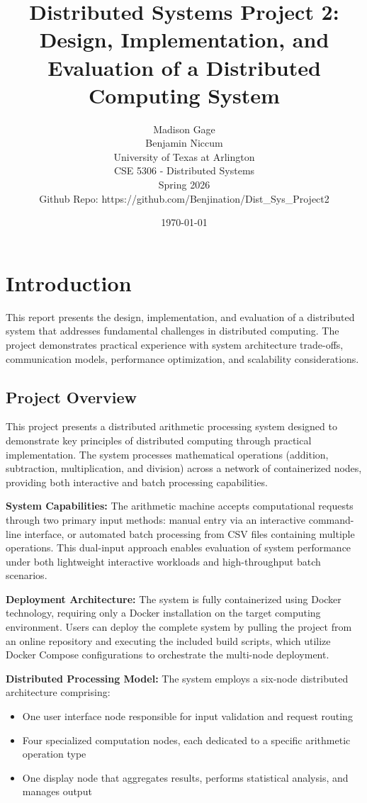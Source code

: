 \documentclass{article}
\title{Distributed Systems Project 2: Design, Implementation, and Evaluation of a Distributed Computing System}
\author{Madison Gage \\ Benjamin Niccum \\ University of Texas at Arlington \\ CSE 5306 - Distributed Systems \\ Spring 2026 \\ Github Repo: https://github.com/Benjination/Dist\_Sys\_Project2}
\date{\today}
\begin{document}
\maketitle
\thispagestyle{empty}
\newpage

\tableofcontents
\newpage

\section{Introduction}

This report presents the design, implementation, and evaluation of a distributed system that addresses fundamental challenges in distributed computing. The project demonstrates practical experience with system architecture trade-offs, communication models, performance optimization, and scalability considerations.

\subsection{Project Overview}

This project presents a distributed arithmetic processing system designed to demonstrate key principles of distributed computing through practical implementation. The system processes mathematical operations (addition, subtraction, multiplication, and division) across a network of containerized nodes, providing both interactive and batch processing capabilities.

\textbf{System Capabilities:} The arithmetic machine accepts computational requests through two primary input methods: manual entry via an interactive command-line interface, or automated batch processing from CSV files containing multiple operations. This dual-input approach enables evaluation of system performance under both lightweight interactive workloads and high-throughput batch scenarios.

\textbf{Deployment Architecture:} The system is fully containerized using Docker technology, requiring only a Docker installation on the target computing environment. Users can deploy the complete system by pulling the project from an online repository and executing the included build scripts, which utilize Docker Compose configurations to orchestrate the multi-node deployment.

\textbf{Distributed Processing Model:} The system employs a six-node distributed architecture comprising:
\begin{itemize}
    \item One user interface node responsible for input validation and request routing
    \item Four specialized computation nodes, each dedicated to a specific arithmetic operation type
    \item One display node that aggregates results, performs statistical analysis, and manages output
\end{itemize}
\end{document}
